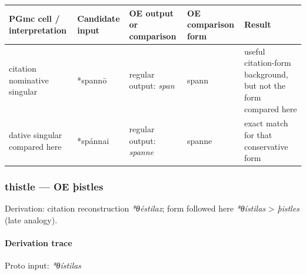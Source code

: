 \documentclass[
  british,
  a4paper,
]{article}
\newcounter{none} %
\begin{document}
{\def\LTcaptype{none} %
\begin{longtable}[]{@{}
  >{\raggedright\arraybackslash}p{}
  >{\raggedright\arraybackslash}p{}
  >{\raggedright\arraybackslash}p{}
  >{\raggedright\arraybackslash}p{}
  >{\raggedright\arraybackslash}p{}@{}}
\toprule\noalign{}
\begin{minipage}[b]{\linewidth}\raggedright
PGmc cell / interpretation
\end{minipage} & \begin{minipage}[b]{\linewidth}\raggedright
Candidate input
\end{minipage} & \begin{minipage}[b]{\linewidth}\raggedright
OE output or comparison
\end{minipage} & \begin{minipage}[b]{\linewidth}\raggedright
OE comparison form
\end{minipage} & \begin{minipage}[b]{\linewidth}\raggedright
Result
\end{minipage} \\
\midrule\noalign{}
\endhead
\bottomrule\noalign{}
\endlastfoot
citation nominative singular & *spannō & regular output: \emph{span} &
spann & useful citation-form background, but not the form compared
here \\
dative singular compared here & *spánnai & regular output: \emph{spanne}
& spanne & exact match for that conservative form \\
\end{longtable}
}

\subsubsection{thistle --- OE þistles}\label{thistle-oe-uxfeistles}

Derivation: citation reconstruction \emph{*θéstilaz}; form followed here
\emph{*θístilas} \textgreater{} \emph{þistles} (late analogy).

\paragraph{Derivation trace}\label{derivation-trace-56}

Proto input: \emph{*θístilas}
\end{document}

